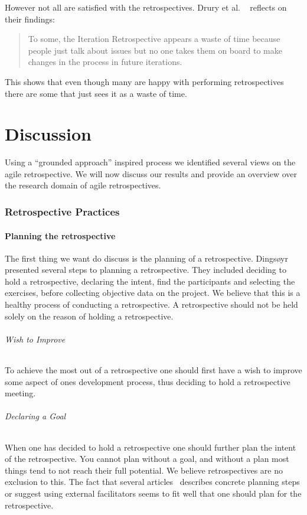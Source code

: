 \documentclass[12pt]{article}
\begin{document}
However not all are satisfied with the retrospectives. Drury et al. ~\cite{Drury2012} reflects on their findings: 
\begin{quote}
To some, the Iteration Retrospective appears a waste of time because people just talk about issues but no one takes them on board to make changes in the process in future iterations.
\end{quote}
This shows that even though many are happy with performing retrospectives there are some that just sees it as a waste of time. 

\clearpage

\part{Discussion}
Using a ``grounded approach'' inspired process we identified several views on the agile retrospective. We will now discuss our results and provide an overview over the research domain of agile retrospectives.

\section{Retrospective Practices}
\subsection{Planning the retrospective}
The first thing we want do discuss is the planning of a retrospective. Dingsøyr~\cite{Dingsoyr2005} presented several steps to planning a retrospective. They included deciding to hold a retrospective, declaring the intent, find the participants and selecting the exercises, before collecting objective data on the project. We believe that this is a healthy process of conducting a retrospective. A retrospective should not be held solely on the reason of holding a retrospective. 

\paragraph{Wish to Improve} 
To achieve the most out of a retrospective one should first have a wish to improve some aspect of ones development process, thus deciding to hold a retrospective meeting. 

\paragraph{Declaring a Goal}
When one has decided to hold a retrospective one should further plan the intent of the retrospective. You cannot plan without a goal, and without a plan most things tend to not reach their full potential. We believe retrospectives are no exclusion to this. The fact that several articles~\cite{Dingsoyr2005, Bjornson2009, Hanssen2003, Maham2008, Birk2002, Moe2001} describes concrete planning steps or suggest using external facilitators seems to fit well that one should plan for the retrospective. 
\end{document}

